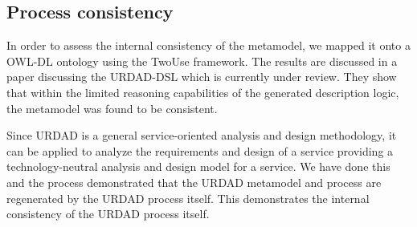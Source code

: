
\subsection{Process consistency}
\label{sec:processConsistence}

In order to assess the internal consistency of the metamodel, we mapped it onto a OWL-DL ontology using the TwoUse framework\cite{parreiras_using_2010}. The results are discussed in a paper discussing the URDAD-DSL which is currently under review. They show that within the limited reasoning capabilities of the generated description logic, the metamodel was found to be consistent.

Since URDAD is a general service-oriented analysis and design methodology, it can be applied to analyze the requirements and design of a service providing a technology-neutral analysis and design model for a service. We have done this and the process demonstrated that the URDAD metamodel and process are regenerated by the URDAD process itself. This demonstrates the internal consistency of the URDAD process itself.
